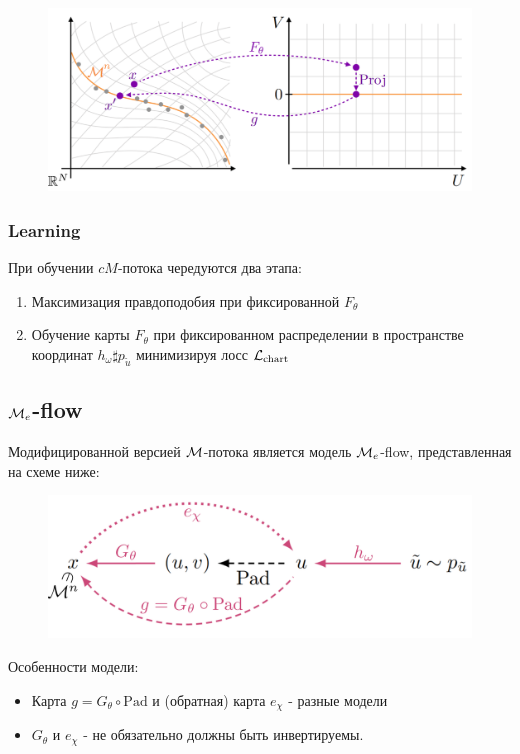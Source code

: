 \begin{figure}[h]
    \centering
    \includegraphics[width=0.6\linewidth]{chapters/petr_mokrov_s1/figs/mflow_manifold_final2.png}
\end{figure}

\subsubsection{Learning}

При обучении $cM$-потока чередуются два этапа: 
\begin{enumerate}
    \item Максимизация правдоподобия при фиксированной $F_{\theta}$
    \item Обучение карты $F_{\theta}$ при фиксированном распределении в пространстве координат $h_{\omega}\sharp p_{\tilde{u}}$ минимизируя лосс $\mathcal{L}_{\text{chart}}$
\end{enumerate}

\subsection{$\mathcal{M}_e$-flow}

Модифицированной версией $\mathcal{M}$-потока является модель $\mathcal{M}_e$-flow, представленная на схеме ниже: 

\begin{figure}[h]
    \centering
    \includegraphics[width=0.6\linewidth]{chapters/petr_mokrov_s1/figs/mEflow_final.png}
\end{figure}

Особенности модели: 
\begin{itemize}
    \item Карта $g = G_{\theta} \circ \text{Pad}$ и (обратная) карта $e_{\chi}$ - разные модели
    \item $G_{\theta}$ и $e_{\chi}$ - не обязательно должны быть инвертируемы.
\end{itemize}

